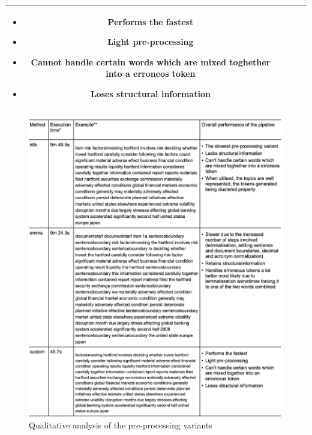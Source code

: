 \documentclass[12pt,MSc,a4paper,oneside]{muthesis}
\begin{document}
\begin{table}
\begin{tabularx}{\textwidth}{|c|c|X|c|}
    \begin{itemize}
      \item Performs the fastest
      \item Light pre-processing
      \item Cannot handle certain words which are mixed toghether into a erroneos token
      \item Loses structural information
    \end{itemize}\\
    \bottomrule

  \end{tabularx}
\end{table}

\begin{figure}[h]
  \includegraphics[scale=0.52]{images/pre-processing-variantas.png}
  \caption{Qualitative analysis of the pre-processing variants}
\end{figure}
\end{document}
